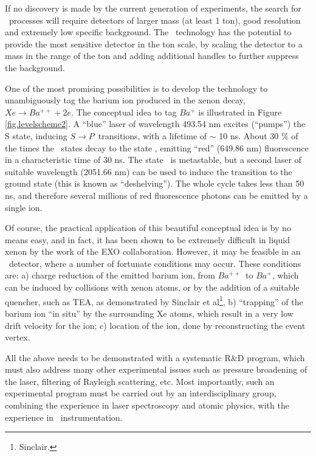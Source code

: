 \documentclass[a4paper,11pt,oneside]{article}
\begin{document}

If no discovery is made by the current generation of experiments, the search for \bbonu\ processes will require detectors of larger mass (at least 1 ton), good resolution and extremely low specific background. The \HPXE\ technology has the potential to provide the most sensitive detector in the ton scale, by scaling the detector to a mass in the range of the ton and adding additional handles to further suppress the background. 

One of the most promising possibilities is to develop the technology to unambiguously tag the barium ion produced in the xenon decay, $Xe \rightarrow Ba^{++} + 2 e$. The conceptual idea to tag $Ba^{+}$ is illustrated in Figure \ref{fig.levelscheme2}. A ``blue'' laser of wavelength 493.54 nm excites (``pumps'') the S state, inducing $S \rightarrow P$~transitions, with a lifetime of $\sim$ 10 ns. About 30 \% of the times the \TwoP\ states decay to the state \TwoD, emitting ``red'' (649.86 nm) fluorescence in a characteristic time of 30 ns. The state \TwoD\ is metastable, but a second laser of suitable wavelength (2051.66 nm) can be used to induce the transition to the ground state (this is known as ``deshelving'').  The whole cycle takes less than 50 ns, and therefore several millions of red fluorescence photons can be emitted by a single ion. 

Of course, the practical application of this beautiful conceptual idea is by no means easy, and in fact, it has been shown to be extremely difficult in liquid xenon by the work of the EXO collaboration. However, it may be feasible in an \HPXE\ detector, where a number of fortunate conditions may occur. These conditions are: a) charge reduction of the emitted barium ion, from $Ba^{++}$~to $Ba^{+}$, which can be induced by collisions with xenon atoms, or by the addition of a suitable quencher, such as TEA, as demonstrated by Sinclair et al\footnote{Sinclair.}, b) ``trapping'' of the barium ion ``in situ'' by the surrounding Xe atoms, which result in a very low drift velocity for the ion; c) location of the ion, done by reconstructing the event vertex. 

All the above needs to be demonstrated with a systematic R\&D program, which must also address many other experimental issues such as pressure broadening of the laser, filtering of Rayleigh scattering, etc. Most importantly, such an experimental program must be carried out by an interdisciplinary group, combining the experience in laser spectroscopy and atomic physics, with the experience in \HPXE\ instrumentation.
\end{document}

